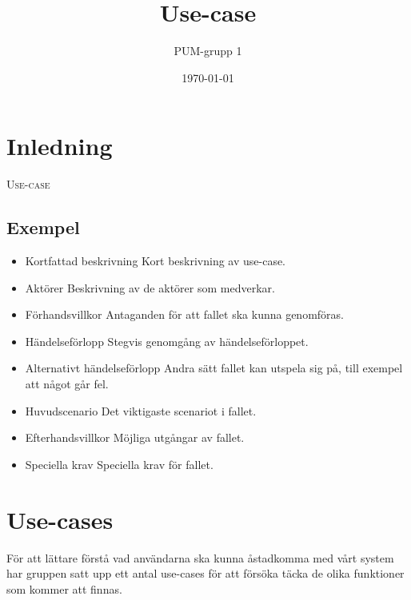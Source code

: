 

\ifpdf
\else
\fi

\title{Use-case}
\author{PUM-grupp 1}
\date{\today}



\maketitle\thispagestyle{empty}

\newpage

\section{Inledning}

\textsc{\LARGE Use-case}

\subsection{Exempel}
\begin{itemize}
	\item Kortfattad beskrivning
	Kort beskrivning av use-case.
	\item Aktörer
	Beskrivning av de aktörer som medverkar.
	\item Förhandsvillkor
	Antaganden för att fallet ska kunna genomföras.
	\item Händelseförlopp
	Stegvis genomgång av händelseförloppet.
	\item Alternativt händelseförlopp
	Andra sätt fallet kan utspela sig på, till exempel att något går fel.
	\item Huvudscenario
	Det viktigaste scenariot i fallet.
	\item Efterhandsvillkor
	Möjliga utgångar av fallet.
	\item Speciella krav
	Speciella krav för fallet.
\end{itemize}

\section{Use-cases} 

För att lättare förstå vad användarna ska kunna åstadkomma med vårt system har gruppen satt upp ett antal use-cases för att försöka täcka de olika funktioner som kommer att finnas.

